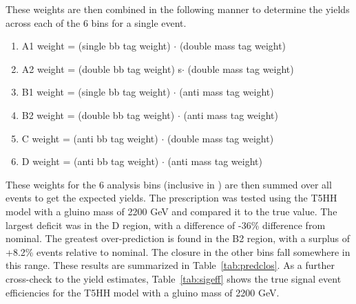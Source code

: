 These weights are then combined in the following manner to determine the yields across each of the 6 bins for a single event.

\begin{enumerate}
\item A1 weight = (single bb tag weight) $\cdot$ (double mass tag weight)
\item A2 weight = (double bb tag weight) s$\cdot$ (double mass tag weight)
\item B1 weight = (single bb tag weight) $\cdot$ (anti mass tag weight)
\item B2 weight = (double bb tag weight) $\cdot$ (anti mass tag weight)
\item C weight = (anti bb tag weight) $\cdot$ (double mass tag weight)
\item D weight = (anti bb tag weight) $\cdot$ (anti mass tag weight)
\end{enumerate}

These weights for the 6 analysis bins (inclusive in \ptmiss) are then summed over all events to get the expected yields.
The prescription was tested using the T5HH model with a gluino mass of 2200 GeV and compared it to the true value.
The largest deficit was in the D region, with a difference of -36\% difference from nominal.
The greatest over-prediction is found in the B2 region, with a surplus of +8.2\% events relative to nominal.
The closure in the other bins fall somewhere in this range.
These results are summarized in Table~\ref{tab:predclos}.
As a further cross-check to the yield estimates, Table~\ref{tab:sigeff} shows the true signal event efficiencies for the T5HH model with a gluino mass of 2200 GeV.

